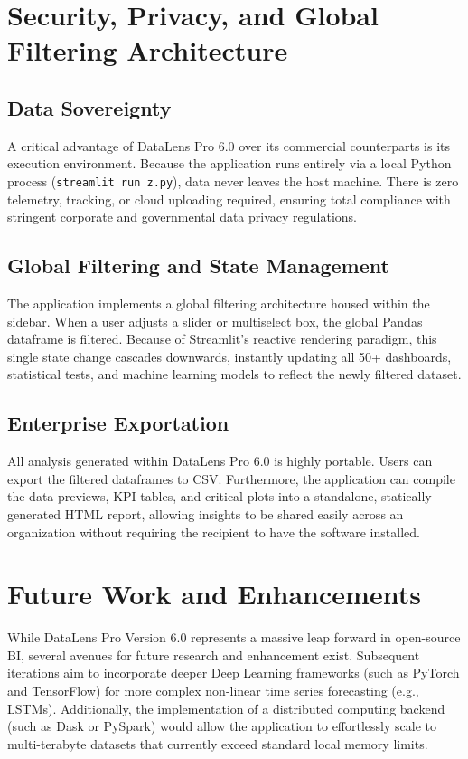\documentclass[12pt, a4paper]{article}
\begin{document}
\section{Security, Privacy, and Global Filtering Architecture}
\subsection{Data Sovereignty}
A critical advantage of DataLens Pro 6.0 over its commercial counterparts is its execution environment. Because the application runs entirely via a local Python process (\texttt{streamlit run z.py}), data never leaves the host machine. There is zero telemetry, tracking, or cloud uploading required, ensuring total compliance with stringent corporate and governmental data privacy regulations.
\subsection{Global Filtering and State Management}
The application implements a global filtering architecture housed within the sidebar. When a user adjusts a slider or multiselect box, the global Pandas dataframe is filtered. Because of Streamlit's reactive rendering paradigm, this single state change cascades downwards, instantly updating all 50+ dashboards, statistical tests, and machine learning models to reflect the newly filtered dataset. 
\subsection{Enterprise Exportation}
All analysis generated within DataLens Pro 6.0 is highly portable. Users can export the filtered dataframes to CSV. Furthermore, the application can compile the data previews, KPI tables, and critical plots into a standalone, statically generated HTML report, allowing insights to be shared easily across an organization without requiring the recipient to have the software installed.
\section{Future Work and Enhancements}
While DataLens Pro Version 6.0 represents a massive leap forward in open-source BI, several avenues for future research and enhancement exist. Subsequent iterations aim to incorporate deeper Deep Learning frameworks (such as PyTorch and TensorFlow) for more complex non-linear time series forecasting (e.g., LSTMs). Additionally, the implementation of a distributed computing backend (such as Dask or PySpark) would allow the application to effortlessly scale to multi-terabyte datasets that currently exceed standard local memory limits. 
\end{document}
